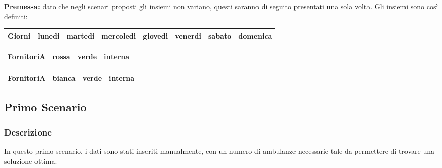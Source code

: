 \textbf{Premessa: } dato che negli scenari proposti gli insiemi non variano, questi saranno di seguito presentati una sola volta.
Gli insiemi sono così definiti: \newline \vspace*{0.1 cm} \newline
\begin{tabular}{|| c || c c c c c c c ||}
    \hline
    Giorni & lunedi & martedi & mercoledi & giovedi & venerdi & sabato & domenica \\ 
    \hline
\end{tabular}
\newline
\vspace*{0.3 cm}
\newline
\begin{tabular}{|| c || c c c ||}
    \hline
        FornitoriA & rossa & verde & interna \\
    \hline
    
\end{tabular}
\newline
\vspace*{0.3 cm}
\newline
\begin{tabular}{|| c || c c c ||}
    \hline
        FornitoriA & bianca & verde & interna \\
    \hline
    
\end{tabular}

\subsection{Primo Scenario}
\subsubsection{Descrizione}
In questo primo scenario, i dati sono stati inseriti manualmente, con un numero di ambulanze necessarie tale da permettere di trovare una soluzione ottima.
